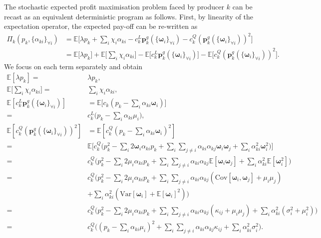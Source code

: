\documentclass{article}
\begin{document}
The stochastic expected profit maximisation problem faced by producer $k$ can be recast as an equivalent deterministic program as follows. First, by linearity of the expectation operator, the expected pay-off can be re-written as
\begin{align*}
\Pi_k(p_k, \{\alpha_{ki}\}_{\forall i}) &= \mathbb{E}\Big[\lambda p_k + \sum_i \chi_i \alpha_{ki} - c_k^L \mathbf{p}_k^g(\{\boldsymbol{\omega}_i\}_{\forall i}) - c_k^Q (\mathbf{p}_k^g(\{\boldsymbol{\omega}_i\}_{\forall i}))^2\Big]\\
&= \mathbb{E}\big[\lambda p_k\big] + \mathbb{E}\Big[\sum_i \chi_i \alpha_{ki}\Big] - \mathbb{E}\big[c_k^L \mathbf{p}_k^g(\{\boldsymbol{\omega}_i\}_{\forall i})\big] - \mathbb{E}\big[c_k^Q (\mathbf{p}_k^g(\{\boldsymbol{\omega}_i\}_{\forall i}))^2\big].
\end{align*}
We focus on each term separately and obtain
\begin{align*}
\mathbb{E}[\lambda p_k] =& \lambda p_k,\\
\mathbb{E}\Big[\sum_i \chi_i \alpha_{ki}\Big] =& \sum_i \chi_i \alpha_{ki},\\
\mathbb{E}[c_k^L \mathbf{p}_k^g(\{\boldsymbol{\omega}_i\}_{\forall i})] &= \mathbb{E}\Big[c_k (p_k - \sum_i \alpha_{ki} \boldsymbol{\omega}_i)\Big]\\
=& c_k^L\Big(p_k - \sum_i \alpha_{ki} \mu_i\Big),\\
\mathbb{E}[c_k^Q (\mathbf{p}_k^g(\{\boldsymbol{\omega}_i\}_{\forall i}))^2] &= \mathbb{E}[c_k^Q (p_k - \sum_i \alpha_{ki} \boldsymbol{\omega}_i)^2]\\
=& \mathbb{E}\Big[c_k^Q \big(p_k^2 - \sum_i 2 \boldsymbol{\omega}_i \alpha_{ki} p_k + \sum_i \sum_{j \ne i} \alpha_{ki} \alpha_{kj}  \boldsymbol{\omega}_i  \boldsymbol{\omega}_j + \sum_i \alpha_{ki}^2 \boldsymbol{\omega}_i^2\big)\Big]\\
=& c_k^Q \Big(p_k^2 - \sum_i 2\mu_i \alpha_{ki} p_k + \sum_i \sum_{j \ne i} \alpha_{ki} \alpha_{kj}  \mathbb{E}[\boldsymbol{\omega}_i  \boldsymbol{\omega}_j] + \sum_i \alpha_{ki}^2 \mathbb{E}[\boldsymbol{\omega}_i^2]\Big)\\
=& c_k^Q \Big(p_k^2 - \sum_i 2\mu_i \alpha_{ki} p_k + \sum_i \sum_{j \ne i} \alpha_{ki} \alpha_{kj}  (\mbox{Cov}[\boldsymbol{\omega}_i, \boldsymbol{\omega}_j] + \mu_i \mu_j)\\
 &+ \sum_i \alpha_{ki}^2 (\mbox{Var}[\boldsymbol{\omega}_i] + \mathbb{E}[\boldsymbol{\omega}_i]^2)\Big)\\
=& c_k^Q \Big(p_k^2 - \sum_i 2\mu_i \alpha_{ki} p_k + \sum_i \sum_{j \ne i} \alpha_{ki} \alpha_{kj}  (\kappa_{ij} + \mu_i \mu_j) + \sum_i \alpha_{ki}^2 (\sigma_i^2 + \mu_i^2)\Big)\\
=& c_k^Q \Big((p_k - \sum_i \alpha_{ki} \mu_i)^2 + \sum_i \sum_{j \ne i} \alpha_{ki} \alpha_{kj}  \kappa_{ij} + \sum_i \alpha_{ki}^2 \sigma_i^2 \Big).
\end{align*}
\end{document}
